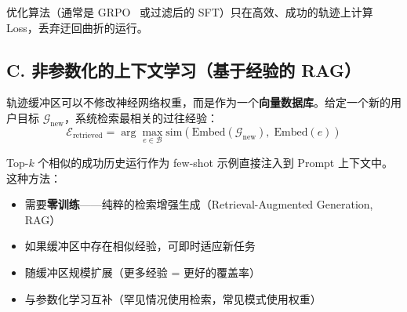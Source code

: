 优化算法（通常是 GRPO~\cite{shao2024deepseekmath} 或过滤后的 SFT）只在高效、成功的轨迹上计算 Loss，丢弃迂回曲折的运行。

\subsection{C. 非参数化的上下文学习（基于经验的 RAG）}
\label{c.-non-parametric-in-context-learning-rag-over-experiences}

轨迹缓冲区可以不修改神经网络权重，而是作为一个\textbf{向量数据库}。给定一个新的用户目标 $\mathcal{G}_{\text{new}}$，系统检索最相关的过往经验：
\begin{equation}
\boxed{\mathcal{E}_{\text{retrieved}} = \arg\max_{e \in \mathcal{B}} \text{sim}\!\left(\text{Embed}(\mathcal{G}_{\text{new}}),\; \text{Embed}(e)\right)}
\end{equation}

Top-$k$ 个相似的成功历史运行作为 few-shot 示例直接注入到 Prompt 上下文中。这种方法：

\begin{itemize}
  \item 需要\textbf{零训练}——纯粹的检索增强生成（Retrieval-Augmented Generation, RAG）
  \item 如果缓冲区中存在相似经验，可即时适应新任务
  \item 随缓冲区规模扩展（更多经验 = 更好的覆盖率）
  \item 与参数化学习互补（罕见情况使用检索，常见模式使用权重）
\end{itemize}

